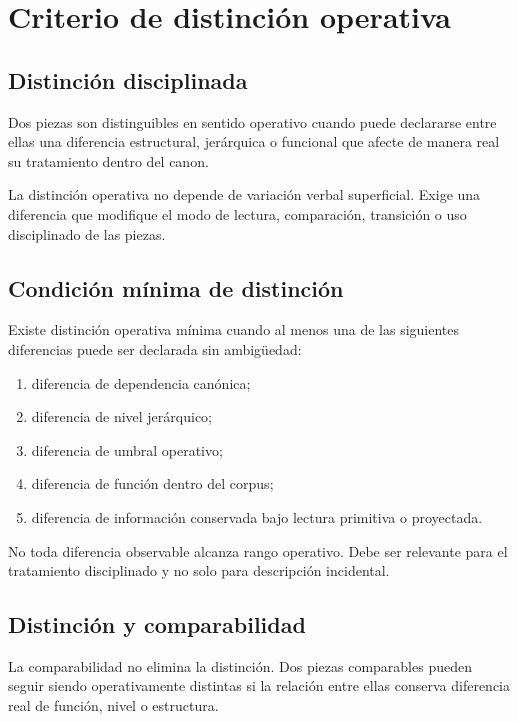 \chapter{Criterio de distinción operativa}

\section{Distinción disciplinada}
\begin{definition}
Dos piezas son distinguibles en sentido operativo cuando puede declararse entre ellas una diferencia estructural, jerárquica o funcional que afecte de manera real su tratamiento dentro del canon.
\end{definition}

\begin{observation}
La distinción operativa no depende de variación verbal superficial. Exige una diferencia que modifique el modo de lectura, comparación, transición o uso disciplinado de las piezas.
\end{observation}

\section{Condición mínima de distinción}
\begin{definition}
Existe distinción operativa mínima cuando al menos una de las siguientes diferencias puede ser declarada sin ambigüedad:
\begin{enumerate}
  \item diferencia de dependencia canónica;
  \item diferencia de nivel jerárquico;
  \item diferencia de umbral operativo;
  \item diferencia de función dentro del corpus;
  \item diferencia de información conservada bajo lectura primitiva o proyectada.
\end{enumerate}
\end{definition}

\begin{observation}
No toda diferencia observable alcanza rango operativo. Debe ser relevante para el tratamiento disciplinado y no solo para descripción incidental.
\end{observation}

\section{Distinción y comparabilidad}
\begin{definition}
La comparabilidad no elimina la distinción. Dos piezas comparables pueden seguir siendo operativamente distintas si la relación entre ellas conserva diferencia real de función, nivel o estructura.
\end{definition}

